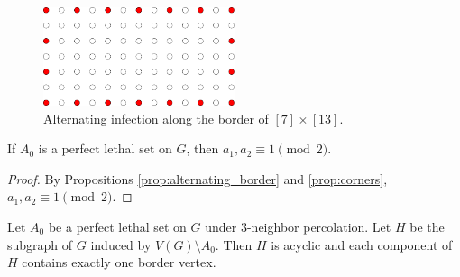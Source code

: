 \begin{figure}[]
\centering
\includegraphics[width=0.5\textwidth]{figures/6/border.pdf}
\caption{Alternating infection along the border of $[7] \times [13]$.}
\label{fig:border}
\end{figure} 

\begin{prop}
\label{prop:odd_by_odd}
If $A_0$ is a perfect lethal set on $G$, then $a_1, a_2 \equiv 1 \pmod 2$.
\end{prop}

\begin{proof}
By Propositions \ref{prop:alternating_border} and \ref{prop:corners}, $a_1, a_2 \equiv 1 \pmod 2$.
\end{proof}

\begin{prop}
\label{prop:one_border_vertex}
Let $A_0$ be a perfect lethal set on $G$ under $3$-neighbor percolation. Let $H$ be the subgraph of $G$ induced by $V(G) \setminus A_0$. Then $H$ is acyclic and each component of $H$ contains exactly one border vertex.
\end{prop}

